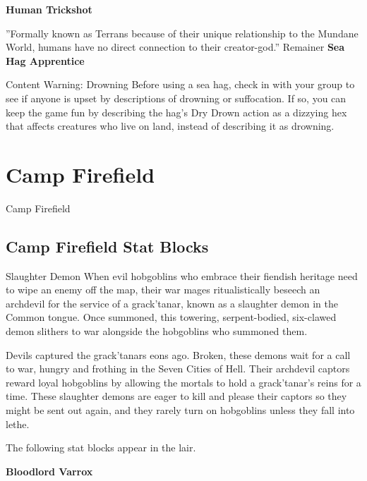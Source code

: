 \documentclass[10pt,a4paper,twoside,bg=print,twocolumn,openany,nodeprecatedcode]{dndbook}
\begin{document}
\textbf{Human Trickshot}

\DndQuote%
{}
{''Formally known as Terrans because of their unique relationship to the Mundane World, humans have no direct connection to their creator-god.''}
{Remainer}
\textbf{Sea Hag Apprentice}

\begin{DndSidebar}[float=!b]{Content Warning: Drowning}
Before using a sea hag, check in with your group to see if anyone is upset by descriptions of drowning or suffocation. If so, you can keep the game fun by describing the hag's Dry Drown action as a dizzying hex that affects creatures who live on land, instead of describing it as drowning.



\end{DndSidebar}

\chapter{Camp Firefield}
Camp Firefield

\section{Camp Firefield Stat Blocks}
\begin{DndSidebar}[float=!b]{Slaughter Demon}
When evil hobgoblins who embrace their fiendish heritage need to wipe an enemy off the map, their war mages ritualistically beseech an archdevil for the service of a grack'tanar, known as a slaughter demon in the Common tongue. Once summoned, this towering, serpent-bodied, six-clawed demon slithers to war alongside the hobgoblins who summoned them.



Devils captured the grack'tanars eons ago. Broken, these demons wait for a call to war, hungry and frothing in the Seven Cities of Hell. Their archdevil captors reward loyal hobgoblins by allowing the mortals to hold a grack'tanar's reins for a time. These slaughter demons are eager to kill and please their captors so they might be sent out again, and they rarely turn on hobgoblins unless they fall into lethe.



\end{DndSidebar}

The following stat blocks appear in the lair.

\textbf{Bloodlord Varrox}
\end{document}

